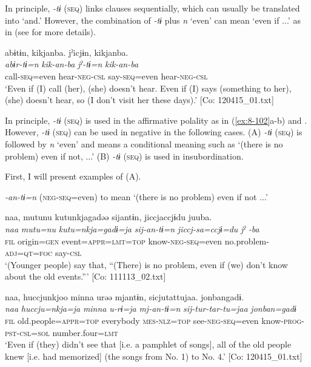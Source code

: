 In principle, \textit{-tɨ} (\textsc{seq}) links clauses sequentially, which can usually be translated into ‘and.’ However, the combination of \textit{-tɨ} plus \textit{n} ‘even’ can mean ‘even if ...’ as in  (see  for more details).

\ea\label{ex:8-103}
  {\TM}
\glll  abɨtɨn,  kikjanba.  jˀicjɨn,  kikjanba.\\
\textit{abɨr-tɨ=n}  \textit{kik-an-ba}  \textit{jˀ-tɨ=n}  \textit{kik-an-ba}\\
call-\textsc{seq}=even  hear-\textsc{neg}-\textsc{csl}  say-\textsc{seq}=even  hear-\textsc{neg}-\textsc{csl}\\
\glt ‘Even if (I) call (her), (she) doesn’t hear. Even if (I) says (something to her), (she) doesn’t hear, so (I don’t visit her these days).’ [Co: 120415\_01.txt]
\z

In principle, \textit{-tɨ} (\textsc{seq}) is used in the affirmative polality as in (\ref{ex:8-102}a-b) and . However, \textit{-tɨ} (\textsc{seq}) can be used in negative in the following cases. (A) \textit{-tɨ} (\textsc{seq}) is followed by \textit{n} ‘even’ and means a conditional meaning such as ‘(there is no problem) even if not, ...’ (B) \textit{-tɨ} (\textsc{seq}) is used in insubordination.

First, I will present examples of (A).

\ea\label{ex:8-104}
  \textit{-an-tɨ=n} (\textsc{neg}-\textsc{seq}=even) to mean ‘(there is no problem) even if not ...’

\ea
{\TM}
\glll  naa,  mutunu  kutunkjagadəə  sijantɨn,      jiccjaccjɨdu  juuba.\\
\textit{naa}  \textit{mutu=nu}  \textit{kutu=nkja=gadɨ=ja}  \textit{sij-an-tɨ=n}    \textit{jiccj-sa=ccjɨ=du}  \textit{jˀ} \textit{-ba}\\
\textsc{fil}  origin=\textsc{gen}  event=\textsc{appr}=\textsc{lmt}=\textsc{top}  know-\textsc{neg}-\textsc{seq}=even  no.problem-\textsc{adj}=\textsc{qt}=\textsc{foc}  say-\textsc{csl}\\
\glt ‘(Younger people) say that, “(There) is no problem, even if (we) don’t know about the old events.”’ [Co: 111113\_02.txt]

\ex
{\TM}
\glll  naa,  huccjunkjoo  minna  urəə   mjantɨn,  sicjutattujaa.  {\textbar}jonban{\textbar}gadɨ.\\
\textit{naa}  \textit{huccju=nkja=ja}  \textit{minna}  \textit{u-rɨ=ja}     \textit{mj-an-tɨ=n}  \textit{sij-tur-tar-tu=jaa}  \textit{jonban=gadɨ}\\
\textsc{fil}  old.people=\textsc{appr}=\textsc{top}  everybody  \textsc{mes}-\textsc{nlz}=\textsc{top}  see-\textsc{neg}-\textsc{seq}=even  know-\textsc{prog}-\textsc{pst}-\textsc{csl}=\textsc{sol}  number.four=\textsc{lmt}\\
\glt ‘Even if (they) didn’t see that [i.e. a pamphlet of songs], all of the old people knew [i.e. had memorized] (the songs from No. 1) to No. 4.’ [Co: 120415\_01.txt]
\z
\z


